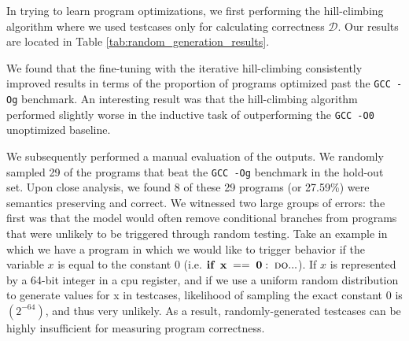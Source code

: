 \documentclass{article}
\begin{document}

In trying to learn program optimizations, we first performing the hill-climbing algorithm where we used testcases only for calculating correctness $\mathcal{D}$. Our results are located in Table \ref{tab:random_generation_results}. 

We found that the fine-tuning with the iterative hill-climbing consistently improved results in terms of the proportion of programs optimized past the \texttt{GCC -Og} benchmark. An interesting result was that the hill-climbing algorithm performed slightly worse in the inductive task of outperforming the \texttt{GCC -O0} unoptimized baseline. 

We subsequently performed a manual evaluation of the outputs. We randomly sampled 29 of the programs that beat the \texttt{GCC -Og} benchmark in the hold-out set. Upon close analysis, we found 8 of these 29 programs (or 27.59\%) were semantics preserving and correct. We witnessed two large groups of errors: the first was that the model would often remove conditional branches from programs that were unlikely to be triggered through random testing. 
%
Take an example in which we have a program in which we would like to trigger behavior if the variable $x$ is equal to the constant 0 (i.e. $\textbf{if} \;\; \mathbf{x\;==\;0:\; \textsc{do}...}$). If $x$ is represented by a 64-bit integer in a cpu register, and if we use a uniform random distribution to generate values for x in testcases,  likelihood of sampling the exact constant 0 is $(2^{-64})$, and thus very unlikely. As a result, randomly-generated testcases can be highly insufficient for measuring program correctness. 

\end{document}
